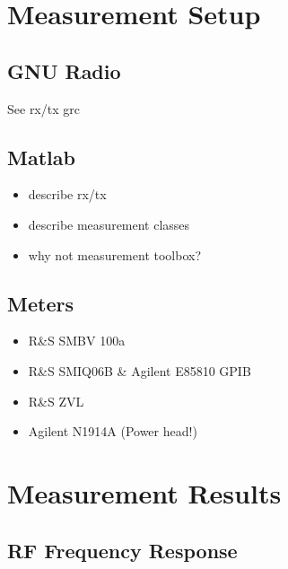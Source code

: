 \documentclass[12pt,a4paper,parskip=full]{scrartcl}
\begin{document}
\section{Measurement Setup}
\subsection{GNU Radio}
See rx/tx grc
\subsection{Matlab}
\begin{itemize}
    \item describe rx/tx
    \item describe measurement classes
    \item why not measurement toolbox?
\end{itemize}
\subsection{Meters}
\begin{itemize}
    \item R\&S SMBV 100a
    \item R\&S SMIQ06B \& Agilent E85810 GPIB
    \item R\&S ZVL
    \item Agilent N1914A (Power head!)
\end{itemize}
\section{Measurement Results}
\subsection{RF Frequency Response}
\end{document}
